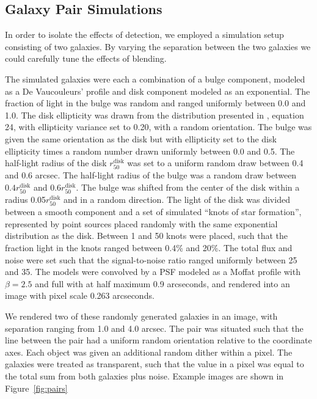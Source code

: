 \documentclass[draft, iop, twocolappendix, appendixfloats, numberedappendix, apj]{hackemulateapj}
\begin{document}
\subsection{Galaxy Pair Simulations}
\label{sec:sims:pairs}

In order to isolate the effects of detection, we employed a simulation setup
consisting of two galaxies.   By varying the separation between the two
galaxies we could carefully tune the effects of blending.

The simulated galaxies were each a combination of a bulge component, modeled as
a De Vaucouleurs' profile \citep{devauc1948} and disk component modeled as an
exponential. The fraction of light in the bulge was random and ranged uniformly
between 0.0 and 1.0. The disk ellipticity was drawn from the distribution
presented in \cite{ba14}, equation 24, with ellipticity variance set to 0.20,
with a random orientation. The bulge was given the same orientation as the disk
but with ellipticity set to the disk ellipticity times a random number drawn
uniformly between 0.0 and 0.5. The half-light radius of the disk
$r_{50}^{\mathrm{disk}}$ was set to a uniform random draw between 0.4 and 0.6
arcsec. The half-light radius of the bulge was a random draw between $0.4
r_{50}^{\mathrm{disk}}$ and $0.6 r_{50}^{\mathrm{disk}}$. The bulge was shifted
from the center of the disk within a radius 0.05$r_{50}^{\mathrm{disk}}$ and in
a random direction. The light of the disk was divided between a smooth
component and a set of simulated ``knots of star formation'', represented by
point sources placed randomly with the same exponential distribution as the
disk.  Between 1 and 50 knots were placed, such that the fraction light in the
knots ranged between 0.4\% and 20\%. The total flux and noise were set such
that the signal-to-noise ratio ranged uniformly between 25 and 35.  The models
were convolved by a PSF modeled as a Moffat \citep{Moffat1969} profile with
$\beta=2.5$ and full with at half maximum 0.9 arcseconds, and rendered into an
image with pixel scale 0.263 arcseconds.

We rendered two of these randomly generated galaxies in an image, with
separation ranging from 1.0 and 4.0 arcsec. The pair was situated such that the
line between the pair had a uniform random orientation relative to the
coordinate axes. Each object was given an additional random dither within a
pixel. The galaxies were treated as transparent, such that the value in a pixel
was equal to the total sum from both galaxies plus noise. Example images are
shown in Figure~\ref{fig:pairs}
\end{document}
